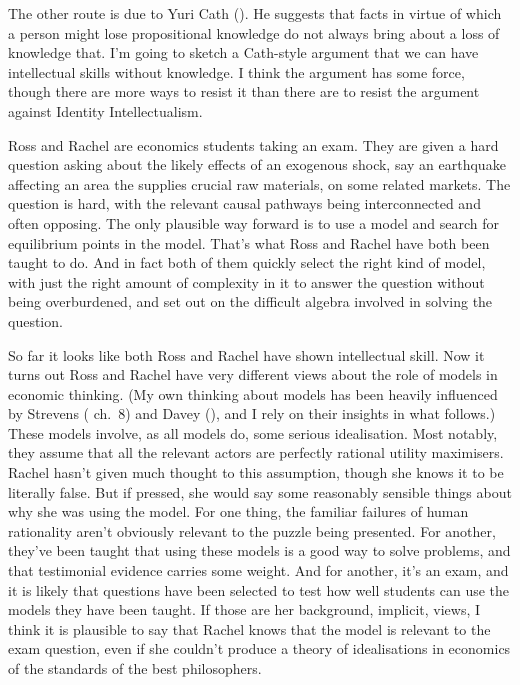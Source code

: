 \documentclass[
  11pt,
  letterpaper,
  DIV=11,
  numbers=noendperiod,
  oneside]{scrartcl}
\begin{document}
The other route is due to Yuri Cath (). He
suggests that facts in virtue of which a person might lose propositional
knowledge do not always bring about a loss of knowledge that. I'm going
to sketch a Cath-style argument that we can have intellectual skills
without knowledge. I think the argument has some force, though there are
more ways to resist it than there are to resist the argument against
Identity Intellectualism.

Ross and Rachel are economics students taking an exam. They are given a
hard question asking about the likely effects of an exogenous shock, say
an earthquake affecting an area the supplies crucial raw materials, on
some related markets. The question is hard, with the relevant causal
pathways being interconnected and often opposing. The only plausible way
forward is to use a model and search for equilibrium points in the
model. That's what Ross and Rachel have both been taught to do. And in
fact both of them quickly select the right kind of model, with just the
right amount of complexity in it to answer the question without being
overburdened, and set out on the difficult algebra involved in solving
the question.

So far it looks like both Ross and Rachel have shown intellectual skill.
Now it turns out Ross and Rachel have very different views about the
role of models in economic thinking. (My own thinking about models has
been heavily influenced by Strevens (
ch.~8) and Davey (), and I rely on their
insights in what follows.) These models involve, as all models do, some
serious idealisation. Most notably, they assume that all the relevant
actors are perfectly rational utility maximisers. Rachel hasn't given
much thought to this assumption, though she knows it to be literally
false. But if pressed, she would say some reasonably sensible things
about why she was using the model. For one thing, the familiar failures
of human rationality aren't obviously relevant to the puzzle being
presented. For another, they've been taught that using these models is a
good way to solve problems, and that testimonial evidence carries some
weight. And for another, it's an exam, and it is likely that questions
have been selected to test how well students can use the models they
have been taught. If those are her background, implicit, views, I think
it is plausible to say that Rachel knows that the model is relevant to
the exam question, even if she couldn't produce a theory of
idealisations in economics of the standards of the best philosophers.
\end{document}

